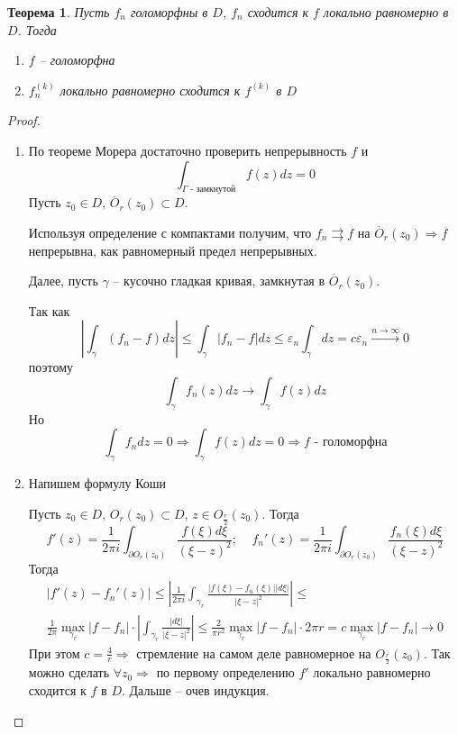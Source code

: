 \documentclass[a4paper,12pt]{article}
\renewcommand{\leq}{\ensuremath{\leqslant}}
\theoremstyle{plain}
\newtheorem{theorem}{Теорема}[section]
\theoremstyle{definition}
\theoremstyle{remark}
\begin{document}
\begin{theorem}
	Пусть $f_n$ голоморфны в $D$, $f_n$ сходится к $f$ локально равномерно в $D$. Тогда
	\begin{enumerate}
		\item $f$ -- голоморфна
		\item $f_n^{(k)}$ локально равномерно сходится к $f^{(k)}$ в $D$
	\end{enumerate}
\end{theorem}

\begin{proof}
	\begin{enumerate}
		\item По теореме Морера достаточно проверить непрерывность $f$ и
		      \[
			      \int_{\Gamma \text{ - замкнутой}}f(z)dz = 0
		      \]
		      Пусть $z_0 \in D,\, \overline{O}_r(z_0) \subset D$.

		      Используя определение с компактами получим, что $f_n \rightrightarrows f$ на $\overline{O}_r(z_0) \Rightarrow f$ непрерывна, как равномерный предел непрерывных.

		      Далее, пусть $\gamma$ -- кусочно гладкая кривая, замкнутая в $\overline{O}_r(z_0)$.

		      Так как
		      \[
			      \left\vert\int_\gamma (f_n - f)dz\right\vert \leq \int_\gamma\vert f_n - f\vert dz \leq \varepsilon_n\int_\gamma dz = c\varepsilon_n \overset{n \to \infty}{\to} 0
		      \]
		      поэтому
		      \[
			      \int_\gamma f_n(z)dz \to \int_\gamma f(z)dz
		      \]
		      Но
		      \[
			      \int_\gamma f_ndz = 0 \Rightarrow \int_\gamma f(z)dz = 0 \Rightarrow f \text{ - голоморфна}
		      \]
		\item Напишем формулу Коши

		      Пусть $z_0 \in D,\, O_r(z_0) \subset D,\, z \in O_{\frac{r}{2}}(z_0)$. Тогда
		      \[
			      f'(z) = \frac{1}{2\pi i} \int_{\partial O_r(z_0)}\frac{f(\xi)d\xi}{(\xi - z)^2};\;\;\;\; f_n'(z) = \frac{1}{2\pi i}\int_{\partial O_r(z_0)}\frac{f_n(\xi)d\xi}{(\xi - z)^2}
		      \]
		      Тогда
		      \begin{align*}
			      \vert f'(z) - f_n'(z)\vert \leq \left\vert\frac{1}{2\pi i}\int_{\gamma_r}\frac{\vert f(\xi) - f_n(\xi)\vert\vert d\xi\vert}{\vert \xi - z\vert^2}\right\vert \leq \\
			      \frac{1}{2\pi}\max_{\gamma_r}\vert f- f_n\vert\cdot\left\vert\int_{\gamma_r}\frac{\vert d\xi\vert}{\vert \xi - z\vert^2}\right\vert \leq \frac{2}{\pi r^2}\max_{\gamma_r}\vert f - f_n\vert\cdot2\pi r = c\max_{\gamma_r}\vert f - f_n\vert \to 0
		      \end{align*}
		      При этом $c = \frac{4}{r} \Rightarrow$ стремление на самом деле равномерное на $O_{\frac{r}{2}}(z_0)$. Так можно сделать $\forall z_0 \Rightarrow$ по первому определению $f'$ локально равномерно сходится к $f$ в $D$. Дальше -- очев индукция.
	\end{enumerate}
\end{proof}
\end{document}
